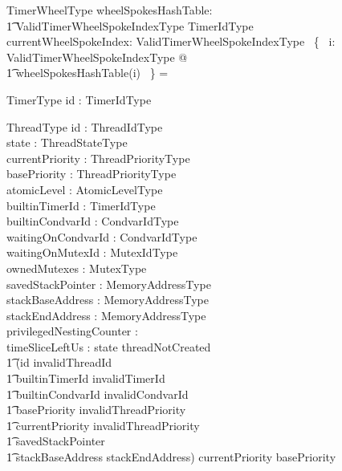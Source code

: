 \documentclass[11pt,letterpaper,twoside,openany]{book}
\begin{document}
\begin{schema}{TimerWheelType}
   wheelSpokesHashTable: \\
   \t1 ValidTimerWheelSpokeIndexType \fun \finset TimerIdType \\
   currentWheelSpokeIndex: ValidTimerWheelSpokeIndexType
\where
    \bigcap~\{~ i: ValidTimerWheelSpokeIndexType @ \\
    \t1 wheelSpokesHashTable(i) ~\} = \emptyset
\end{schema}

\begin{schema}{TimerType}
   id : TimerIdType
\end{schema}

\begin{schema}{ThreadType}
   id : ThreadIdType \\
   state : ThreadStateType \\
   currentPriority : ThreadPriorityType \\
   basePriority : ThreadPriorityType \\
   atomicLevel : AtomicLevelType \\
   builtinTimerId : TimerIdType \\
   builtinCondvarId : CondvarIdType \\
   waitingOnCondvarId : CondvarIdType \\
   waitingOnMutexId : MutexIdType \\
   ownedMutexes : \finset MutexType \\
   savedStackPointer : MemoryAddressType \\
   stackBaseAddress : MemoryAddressType \\
   stackEndAddress : MemoryAddressType \\
   privilegedNestingCounter : \nat \\
   timeSliceLeftUs : \nat
\where
   state \neq threadNotCreated \implies \\
   \t1 (id \neq invalidThreadId \land \\
   \t1 builtinTimerId \neq invalidTimerId \land \\
   \t1 builtinCondvarId \neq invalidCondvarId \land \\
   \t1 basePriority \neq invalidThreadPriority \land \\
   \t1 currentPriority \neq invalidThreadPriority \land \\
   \t1 savedStackPointer \in \\
   \t1 stackBaseAddress \upto stackEndAddress)
\also
   currentPriority \geq basePriority

\end{schema}
\end{document}
